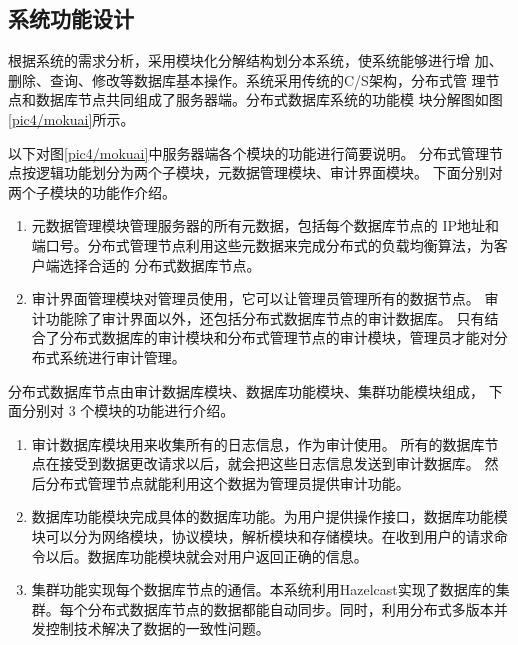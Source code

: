 \subsection{系统功能设计}
根据系统的需求分析，采用模块化分解结构划分本系统，使系统能够进行增
加、删除、查询、修改等数据库基本操作。系统采用传统的C/S架构，分布式管
理节点和数据库节点共同组成了服务器端。分布式数据库系统的功能模
块分解图如图\ref{pic4/mokuai}所示。

以下对图\ref{pic4/mokuai}中服务器端各个模块的功能进行简要说明。
分布式管理节点按逻辑功能划分为两个子模块，元数据管理模块、审计界面模块。
下面分别对两个子模块的功能作介绍。
\begin{enumerate}[fullwidth,itemindent=2em,listparindent=2em]
	\item 元数据管理模块管理服务器的所有元数据，包括每个数据库节点的
	IP地址和端口号。分布式管理节点利用这些元数据来完成分布式的负载均衡算法，为客户端选择合适的
	分布式数据库节点。
	\item 审计界面管理模块对管理员使用，它可以让管理员管理所有的数据节点。
	审计功能除了审计界面以外，还包括分布式数据库节点的审计数据库。
	只有结合了分布式数据库的审计模块和分布式管理节点的审计模块，管理员才能对分布式系统进行审计管理。
\end{enumerate}

分布式数据库节点由审计数据库模块、数据库功能模块、集群功能模块组成，
 下面分别对 3 个模块的功能进行介绍。
 \begin{enumerate}[fullwidth,itemindent=2em,listparindent=2em]
 	\item 审计数据库模块用来收集所有的日志信息，作为审计使用。
 	所有的数据库节点在接受到数据更改请求以后，就会把这些日志信息发送到审计数据库。
 	然后分布式管理节点就能利用这个数据为管理员提供审计功能。
 	\item 数据库功能模块完成具体的数据库功能。为用户提供操作接口，数据库功能模块可以分为网络模块，协议模块，解析模块和存储模块。在收到用户的请求命令以后。数据库功能模块就会对用户返回正确的信息。
 	\item 集群功能实现每个数据库节点的通信。本系统利用Hazelcast实现了数据库的集群。每个分布式数据库节点的数据都能自动同步。同时，利用分布式多版本并发控制技术解决了数据的一致性问题。
 \end{enumerate}
